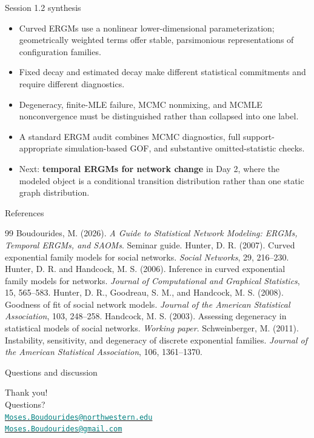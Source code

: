 \documentclass[aspectratio=169,11pt]{beamer}
\newcommand{\term}[1]{\textbf{\color{nupurple}#1}}
\begin{document}
\begin{frame}{Session 1.2 synthesis}
\begin{itemize}
\item Curved ERGMs use a nonlinear lower-dimensional parameterization; geometrically weighted terms offer stable, parsimonious representations of configuration families.
\item Fixed decay and estimated decay make different statistical commitments and require different diagnostics.
\item Degeneracy, finite-MLE failure, MCMC nonmixing, and MCMLE nonconvergence must be distinguished rather than collapsed into one label.
\item A standard ERGM audit combines MCMC diagnostics, full support-appropriate simulation-based GOF, and substantive omitted-statistic checks.
\item Next: \term{temporal ERGMs for network change} in Day 2, where the modeled object is a conditional transition distribution rather than one static graph distribution.
\end{itemize}
\end{frame}

\begin{frame}{References}
\footnotesize
\begin{thebibliography}{99}
 Boudourides, M. (2026). \emph{A Guide to Statistical Network Modeling: ERGMs, Temporal ERGMs, and SAOMs}. Seminar guide.
 Hunter, D. R. (2007). Curved exponential family models for social networks. \emph{Social Networks}, 29, 216--230.
 Hunter, D. R. and Handcock, M. S. (2006). Inference in curved exponential family models for networks. \emph{Journal of Computational and Graphical Statistics}, 15, 565--583.
 Hunter, D. R., Goodreau, S. M., and Handcock, M. S. (2008). Goodness of fit of social network models. \emph{Journal of the American Statistical Association}, 103, 248--258.
 Handcock, M. S. (2003). Assessing degeneracy in statistical models of social networks. \emph{Working paper}.
 Schweinberger, M. (2011). Instability, sensitivity, and degeneracy of discrete exponential families. \emph{Journal of the American Statistical Association}, 106, 1361--1370.
\end{thebibliography}
\end{frame}

\begin{frame}{Questions and discussion}
\begin{center}
\Large{Thank you!}\\[2ex]
\normalsize{Questions?}\\[5ex]
\href{mailto:Moses.Boudourides@northwestern.edu}{\textcolor{teal}{\small\texttt{Moses.Boudourides@northwestern.edu}}}\\[0.8em]
\href{mailto:Moses.Boudourides@gmail.com}{\textcolor{teal}{\small\texttt{Moses.Boudourides@gmail.com}}}
\end{center}
\end{frame}

\end{document}

